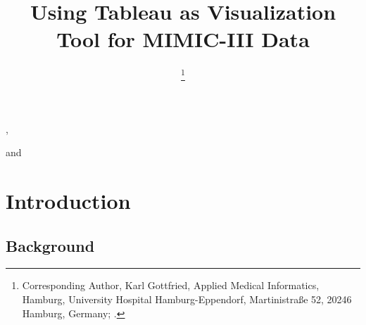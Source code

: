 \documentclass[aac,crcready]{iosart2x}
\begin{document}
\begin{frontmatter}

{\centering \title{Using Tableau as Visualization Tool for MIMIC-III Data
}}


\author[A]{ %
\thanks{Corresponding Author, Karl Gottfried, Applied Medical Informatics, Hamburg, University Hospital Hamburg-Eppendorf, Martinistraße 52, 20246 Hamburg, Germany;  .}},
\author[A]{ }
and
\author[A]{ }
\address[A]{Applied Medical Informatics, , Germany, ,
}
\address[B]{Department first, ,
Abbreviate US states, }


\begin{abstract}


\end{abstract}

\begin{keyword}
\end{keyword}

\end{frontmatter}


\section{Introduction}\label{s1}

\subsection{Background}\label{s1.1}

\end{document}
